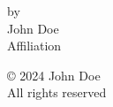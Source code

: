 
\begin{titlepage}

\singlespacing \centering       %
\thispagestyle{empty}           %
\vspace*{0.5in}


{ \par}

\vspace{2in}

by \\
John Doe \\                     %
Affiliation                     %

\vspace{2in}


{\copyright{} 2024 John Doe \\
All rights reserved}


\end{titlepage}

